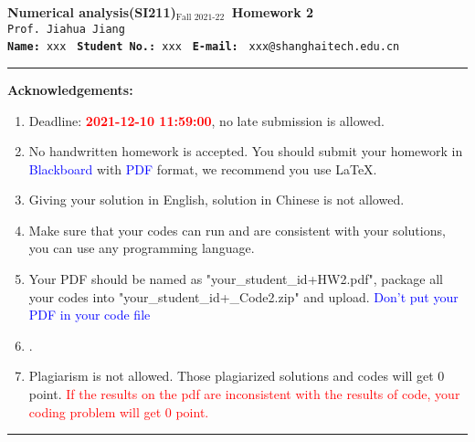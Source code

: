 \documentclass[11pt]{article}
\begin{document}
\begin{center}
	\textbf{\LARGE{Numerical analysis(SI211)$_\text{Fall 2021-22}\,$ Homework 2 } } \\
	\texttt{Prof. Jiahua Jiang }\\
	\texttt{\textbf{Name:} xxx }  \quad 
	\texttt{\textbf{Student No.:} xxx }  \quad 
	\texttt{\textbf{E-mail:}} \texttt{ xxx@shanghaitech.edu.cn}
\par\end{center}

\noindent
\rule{\linewidth}{0.4pt}
{\bf {\large Acknowledgements:}}
\begin{enumerate} 
    \item Deadline: \textcolor{red}{\textbf{2021-12-10 11:59:00}}, no late submission is allowed.
    \item No handwritten homework is accepted. You should submit your homework in \textcolor{blue}{Blackboard} with \textcolor{blue}{PDF} format, we recommend you use \LaTeX. 
    \item Giving your solution in English, solution in Chinese is not allowed.
    \item Make sure that your codes can run and are consistent with your solutions, you can use any  programming language. 
    \item Your PDF should be named as "{\sf your\_student\_id+HW2.pdf}", package all your codes into "{\sf your\_student\_id+\_Code2.zip}" and upload. \textcolor{blue}{ Don't put your PDF in your code file} 
    \item \color{blue}{All the results from your code should be shown in pdf but please do not inset your code into \LaTeX }.
    \item Plagiarism is not allowed. Those plagiarized solutions and codes will get 0 point. \textcolor{red}{
    If the results on the pdf are inconsistent with the results of code, your coding problem will get 0 point.}
    \end{enumerate}
\rule{\linewidth}{0.4pt}
\end{document}
